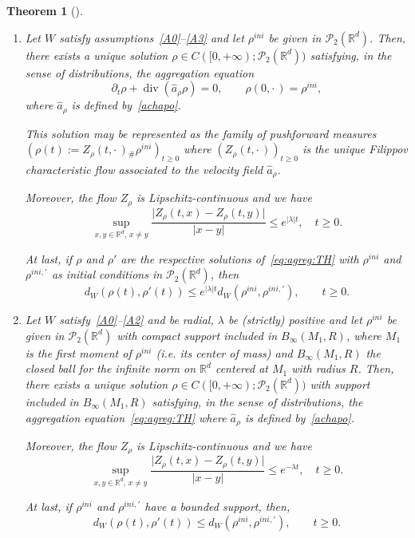 \documentclass[11pt]{article}
\newtheorem{theo}{Theorem}[section]
\theoremstyle{definition}
\numberwithin{equation}{section}
\DeclareMathOperator{\dv}{div}
\newcommand*\RR{\mathbb{R}}
\newcommand*\pa{\partial}
\newcommand*\calP{{\mathcal P}}
\newcommand*\achapo{\widehat{a}}
\newcommand*{\romanenumi}{}%
\begin{document}
\begin{theo}[{\cite[Theorem~2.5 and~2.9]{CJLV}}]\label{Exist}\ 
\begin{enumerate}\romanenumi
\item \label{2.1.1} Let $W$ satisfy assumptions~\eqref{A0}--\eqref{A3} and let $\rho^{ini}$ be given in $\calP_2(\RR^d)$. Then, there exists a unique solution $\rho \in C([0,+\infty);\calP_2(\RR^d))$ satisfying, in the sense of distributions, the aggregation equation
\begin{equation}\label{eq:agreg:TH}
\pa_t \rho + \dv(\achapo_{\rho} \rho ) = 0, \qquad \rho(0,{\cdot\,})=\rho^{ini},
\end{equation}
where $\achapo_{\rho}$ is defined by~\eqref{achapo}.

This solution may be represented as the family of pushforward measures $(\rho(t):=Z_{\rho}(t,{\cdot\,}){}_\# \rho^{ini})_{t \geq 0}$ where $(Z_{\rho}(t,{\cdot\,}))_{t \geq 0}$ is the unique Filippov characteristic flow associated to the velocity field $\achapo_{\rho}$.

Moreover, the flow $Z_{\rho}$ is Lipschitz-continuous and we have
\[
\sup_{x,y\in \RR^d, \, x \not = y}
\frac{\vert Z_{\rho}(t,x) - Z_{\rho}(t,y) \vert}{\vert x- y \vert}
\leq e^{{\vert \lambda \vert}t}, \quad t \geq 0.
\]

At last, if $\rho$ and $\rho'$ are the respective solutions of~\eqref{eq:agreg:TH} with $\rho^{ini}$ and $\rho^{ini,\prime}$ as initial conditions in ${\mathcal P}_{2}(\RR^d)$, then
\[
d_{W}(\rho(t),\rho'(t)) \leq e^{\vert \lambda \vert t} d_{W}(\rho^{ini},\rho^{ini,\prime}), \qquad t \geq 0.
\]

\item \label{2.1.2} Let $W$ satisfy~\eqref{A0}--\eqref{A2} and be radial, $\lambda$ be (strictly) positive and let $\rho^{ini}$ be given in $\calP_2(\RR^d)$ with compact support included in $B_\infty(M_1,R)$, where $M_1$ is the first moment of $\rho^{ini}$ (i.e. its center of mass) and $B_\infty(M_1,R)$ the closed ball for the infinite norm on $\RR^d$ centered at $M_1$ with radius $R$. Then, there exists a unique solution $\rho \in C([0,+\infty);\calP_2(\RR^d))$ with support included in $B_\infty(M_1,R)$ satisfying, in the sense of distributions, the aggregation equation~\eqref{eq:agreg:TH} where $\achapo_{\rho}$ is defined by~\eqref{achapo}.

Moreover, the flow $Z_{\rho}$ is Lipschitz-continuous and we have
\begin{equation}\label{bound1Xbis}
\sup_{x,y\in \RR^d, \, x \not = y}
\frac{\vert Z_{\rho}(t,x) - Z_{\rho}(t,y) \vert}{\vert x- y \vert}
\leq e^{-\lambda t}, \quad t \geq 0.
\end{equation}

At last, if $\rho^{ini}$ and $\rho^{ini,\prime}$ have a bounded support, then,
\[
d_{W}(\rho(t),\rho'(t)) \leq d_{W}(\rho^{ini},\rho^{ini,\prime}), \qquad t \geq 0.
\]
\end{enumerate}
\end{theo}
\end{document}
